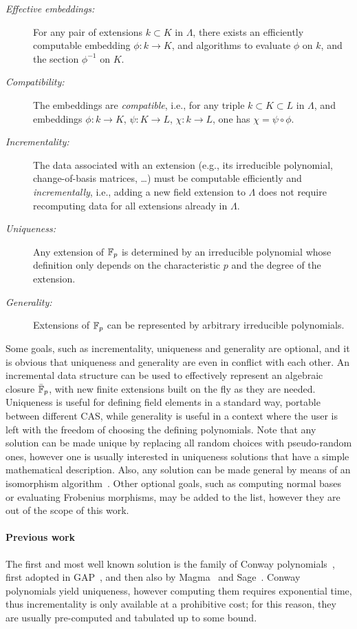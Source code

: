 \documentclass{sig-alternate}
\begin{document}
\begin{description}
\item[\emph{Effective embeddings:}] For any pair of extensions
  $k\subset K$ in $\Lambda$, there exists an efficiently computable
  embedding $\phi:k\to K$, and algorithms to evaluate $\phi$ on $k$,
  and the section $\phi^{-1}$ on $K$.
\item[\emph{Compatibility:}] The embeddings are \emph{compatible},
  i.e., for any triple $k\subset K\subset L$ in $\Lambda$, and
  embeddings $\phi:k\to K$, $\psi:K\to L$, $\chi:k\to L$, one has
  $\chi=\psi\circ\phi$.
\item[\emph{Incrementality:}] The data associated with an extension
  (e.g., its irreducible polynomial, change-of-basis matrices, \dots)
  must be computable efficiently and \emph{incrementally}, i.e.,
  adding a new field extension to $\Lambda$ does not require
  recomputing data for all extensions already in $\Lambda$. %
\item[\emph{Uniqueness:}] Any extension of $\mathbb{F}_{p}$ is determined by an
  irreducible polynomial whose definition only depends on the
  characteristic $p$ and the degree of the extension. %
\item[\emph{Generality:}] Extensions of $\mathbb{F}_{p}$ can be represented by
  arbitrary irreducible polynomials.
\end{description}

Some goals, such as incrementality, uniqueness and generality are
optional, and it is obvious that uniqueness and generality are even in
conflict with each other. %
An incremental data structure can be used to effectively represent an
algebraic closure $\bar{\mathbb{F}}_{p}$, with new finite extensions built on the
fly as they are needed. %
Uniqueness is useful for defining field elements in a standard way,
portable between different CAS, while generality is useful in a
context where the user is left with the freedom of choosing the
defining polynomials. %
Note that any solution can be made unique by replacing all random
choices with pseudo-random ones, however one is usually interested in
uniqueness solutions that have a simple mathematical description. %
Also, any solution can be made general by means of an isomorphism
algorithm~\cite{LenstraJr91,Allombert02,rains2008,brieulle2018computing,narayanan2016fast}. %
Other optional goals, such as computing normal bases or evaluating
Frobenius morphisms, may be added to the list, however they are out of
the scope of this work.

\paragraph{Previous work}
The first and most well known solution is the family of Conway
polynomials~\cite{Nickel1988,heath+loehr99}, first adopted in
GAP~\cite{GAP4}, and then also by Magma~\cite{MAGMA} and
Sage~\cite{Sage}. %
Conway polynomials yield uniqueness, however computing them requires
exponential time, thus incrementality is only available at a
prohibitive cost; for this reason, they are usually pre-computed and
tabulated up to some bound.
\end{document}
